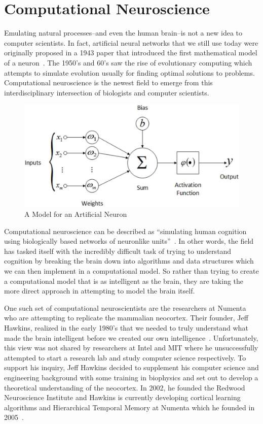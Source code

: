 \documentclass[oneside,12pt,openany]{book}
\begin{document}
	\section{Computational Neuroscience}
	
	Emulating natural processes--and even the human brain--is not a new idea to computer scientists. In fact, artificial neural networks that we still use today were originally proposed in a 1943 paper that introduced the first mathematical model of a neuron~\cite{FundNatComp}. The 1950's and 60's saw the rise of evolutionary computing which attempts to simulate evolution usually for finding optimal solutions to problems. Computational neuroscience is the newest field to emerge from this interdisciplinary intersection of biologists and computer scientists.
	
	\begin{figure}[hbt!]
		\centering
		\includegraphics[width=.8\linewidth]{images/ArtificialNeuron.jpg}
		\caption{A Model for an Artificial Neuron}
		\label{fig:ArtNeuron}
	\end{figure}
	
	Computational neuroscience can be described as ``simulating human cognition using biologically based networks of neuronlike units''~\cite{Eberhart}. In other words, the field has tasked itself with the incredibly difficult task of trying to understand cognition by breaking the brain down into algorithms and data structures which we can then implement in a computational model. So rather than trying to create a computational model that is as intelligent as the brain, they are taking the more direct approach in attempting to model the brain itself.
	
	One such set of computational neuroscientists are the researchers at Numenta who are attempting to replicate the mammalian neocortex. Their founder, Jeff Hawkins, realized in the early 1980's that we needed to truly understand what made the brain intelligent before we created our own intelligence~\cite{OnIntelligence}. Unfortunately, this view was not shared by  researchers at Intel and MIT where he unsuccessfully attempted to start a research lab and study computer science respectively. To support his inquiry, Jeff Hawkins decided to supplement his computer science and engineering background with some training in biophysics and set out to develop a theoretical understanding of the neocortex. In 2002, he founded the Redwood Neuroscience Institute and Hawkins is currently developing cortical learning algorithms and Hierarchical Temporal Memory at Numenta which he founded in 2005~\cite{OnIntelligence}. 
	
\end{document}
